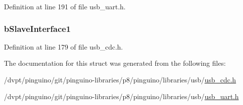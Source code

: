 Definition at line 191 of file usb\-\_\-uart.\-h.

\hypertarget{struct_u_s_b___union___functional___descriptor_a10bb62fbd7e26591abf171f512791d81}{
\subsubsection[{b\-Slave\-Interface1}]{ b\-Slave\-Interface1}}\label{struct_u_s_b___union___functional___descriptor_a10bb62fbd7e26591abf171f512791d81}


Definition at line 179 of file usb\-\_\-cdc.\-h.



The documentation for this struct was generated from the following files\-:\begin{DoxyCompactItemize}
\item 
/dvpt/pinguino/git/pinguino-\/libraries/p8/pinguino/libraries/usb/\hyperlink{usb__cdc_8h}{usb\-\_\-cdc.\-h}\item 
/dvpt/pinguino/git/pinguino-\/libraries/p8/pinguino/libraries/usb/\hyperlink{usb__uart_8h}{usb\-\_\-uart.\-h}\end{DoxyCompactItemize}
